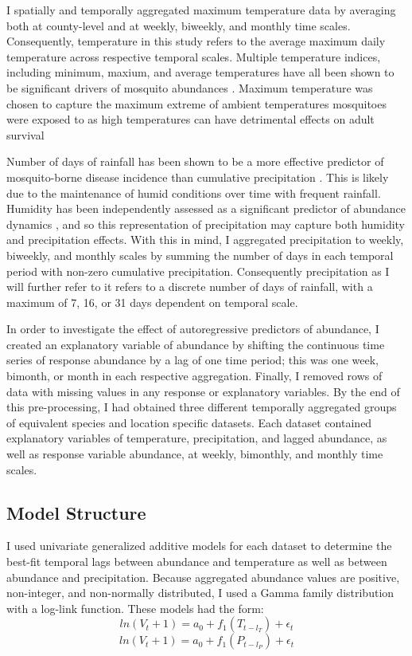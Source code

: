I spatially and temporally aggregated maximum temperature data by averaging both at county-level and at weekly, biweekly, and monthly time scales. Consequently, temperature in this study refers to the average maximum daily temperature across respective temporal scales. Multiple temperature indices, including minimum, maxium, and average temperatures have all been shown to be significant drivers of mosquito abundances \citep{Chaves2013, Roiz2014, Xu2017}. Maximum temperature was chosen to capture the maximum extreme of ambient temperatures mosquitoes were exposed to as high temperatures can have detrimental effects on adult survival \citep{Marini2016}

Number of days of rainfall has been shown to be a more effective predictor of mosquito-borne disease incidence than cumulative precipitation \citep{Xu2017}. This is likely due to the maintenance of humid conditions over time with frequent rainfall. Humidity has been independently assessed as a significant predictor of abundance dynamics \citep{Trawinski2008}, and so this representation of precipitation may capture both humidity and precipitation effects. With this in mind, I aggregated precipitation to weekly, biweekly, and monthly scales by summing the number of days in each temporal period with non-zero cumulative precipitation. Consequently precipitation as I will further refer to it refers to a discrete number of days of rainfall, with a maximum of 7, 16, or 31 days dependent on temporal scale. 

In order to investigate the effect of autoregressive predictors of abundance, I created an explanatory variable of abundance by shifting the continuous time series of response abundance by a lag of one time period; this was one week, bimonth, or month in each respective aggregation. Finally, I removed rows of data with missing values in any response or explanatory variables. By the end of this pre-processing, I had obtained three different temporally aggregated groups of equivalent species and location specific datasets. Each dataset contained explanatory variables of temperature, precipitation, and lagged abundance, as well as response variable abundance, at weekly, bimonthly, and monthly time scales.


\subsection{Model Structure}

I used univariate generalized additive models for each dataset to determine the best-fit temporal lags between abundance and temperature as well as between abundance and precipitation. Because aggregated abundance values are positive, non-integer, and non-normally distributed, I used a Gamma family distribution with a log-link function. These models had the form:
\begin{equation}
	ln(V_t + 1) = a_0 + f_1(T_{t-l_T}) + \epsilon_t
	\label{eq: univariateT}
\end{equation}
\begin{equation}
	ln(V_t + 1) = a_0 + f_1(P_{t-l_P}) + \epsilon_t
	\label{eq: univariateP}
\end{equation}


